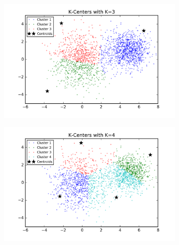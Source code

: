 \begin{figure}[htb]
        \centering
        \begin{subfigure}[b]{0.475\textwidth}
            \centering
            \includegraphics[width=\textwidth]{./figures/clustering_kCenter_3.png}
        \end{subfigure}
        \hfill
        \begin{subfigure}[b]{0.475\textwidth}  
            \centering 
            \includegraphics[width=\textwidth]{./figures/clustering_kCenter_4.png}
        \end{subfigure}
        \begin{subfigure}[b]{0.475\textwidth}  
            \centering 

\end{subfigure}
\end{figure}
